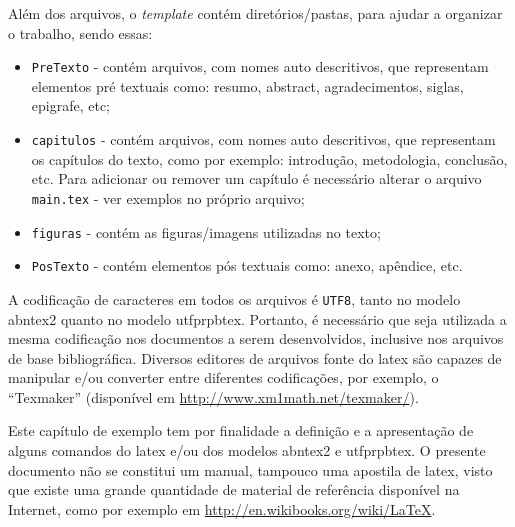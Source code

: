 Além dos arquivos, o \textit{template} contém diretórios/pastas, para ajudar a organizar o trabalho, sendo essas:
\begin{itemize}%
\item \texttt{PreTexto} - contém arquivos, com nomes auto descritivos, que representam elementos pré textuais como:  resumo, abstract, agradecimentos, siglas, epigrafe, etc;
\item \texttt{capitulos} -  contém arquivos, com nomes auto descritivos, que representam os capítulos do texto, como por exemplo: introdução, metodologia, conclusão, etc. Para adicionar ou remover um capítulo é necessário alterar o arquivo \texttt{main.tex} - ver exemplos no próprio arquivo;
\item \texttt{figuras}  - contém as figuras/imagens utilizadas no texto;
\item \texttt{PosTexto} - contém elementos pós textuais como: anexo, apêndice, etc.
\end{itemize}

A codificação de caracteres em todos os arquivos é \texttt{UTF8}, tanto no modelo \gls{abntex2} quanto no modelo \gls{utfprpbtex}. Portanto, é necessário que seja utilizada a mesma codificação nos documentos a serem desenvolvidos, inclusive nos arquivos de base bibliográfica. Diversos editores de arquivos fonte do \gls{latex} são capazes de manipular e/ou converter entre diferentes codificações, por exemplo, o ``Texmaker'' (disponível em \url{http://www.xm1math.net/texmaker/}). 

Este capítulo\label{errata:capitulo} de exemplo tem por finalidade a definição e a apresentação de alguns comandos do \gls{latex} e/ou dos modelos \gls{abntex2} e \gls{utfprpbtex}. O presente documento não se constitui um manual, tampouco uma apostila de \gls{latex}, visto que existe uma grande quantidade de material de referência disponível na Internet, como por exemplo em \url{http://en.wikibooks.org/wiki/LaTeX}.

